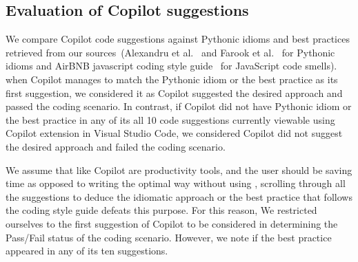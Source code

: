 \subsection{Evaluation of Copilot suggestions}
\label{evaluation}
We compare Copilot code suggestions against Pythonic idioms and best practices retrieved from our sources~(Alexandru et al.~\cite{Alexandru2018} and Farook et al.~\cite{idioms} for Pythonic idioms and AirBNB javascript coding style guide~\cite{airbnb_code} for JavaScript code smells). when Copilot manages to match the Pythonic idiom or the best practice as its first suggestion, we considered it as Copilot suggested the desired approach and passed the coding scenario. 
In contrast, if Copilot did not have Pythonic idiom or the best practice in any of its all 10 code suggestions currently viewable using Copilot extension in Visual Studio Code, we considered Copilot did not suggest the desired approach and failed the coding scenario.

We assume that \cct{} like Copilot are productivity tools, and the user should be saving time as opposed to writing the optimal way without using \cct{}, scrolling through all the suggestions to deduce the idiomatic approach or the best practice that follows the coding style guide defeats this purpose. 
For this reason, We restricted ourselves to the first suggestion of Copilot to be considered in determining the Pass/Fail status of the coding scenario. However, we note if the best practice appeared in any of its ten suggestions.